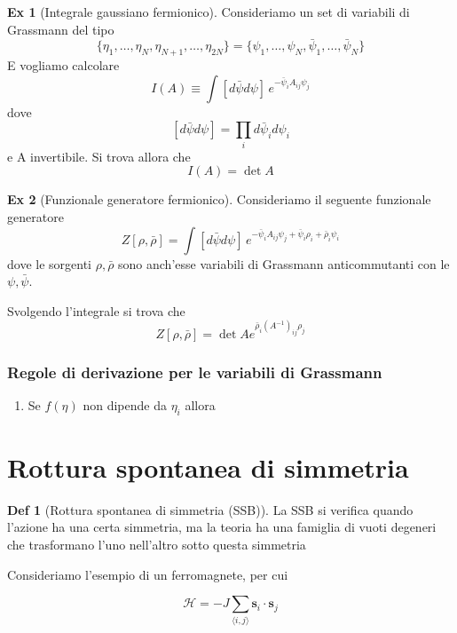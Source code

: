 \documentclass[10pt,a4paper]{article}
\theoremstyle{definition}
\newtheorem{definition}{Def}[section]
\newtheorem{example}{Ex}[section]
\begin{document}
\begin{example}[Integrale gaussiano fermionico]
    Consideriamo un set di variabili di Grassmann del tipo
    \[
    \{\eta_1, \dots, \eta_N, \eta_{N + 1}, \dots, \eta_{2N}\} = \{\psi_1, \dots, \psi_N, \bar{\psi}_1, \dots, \bar{\psi}_N\}    
    \]
    E vogliamo calcolare
    \[
    I(A) \equiv \int [d\bar{\psi}d\psi]\, e^{-\bar{\psi}_i A_{ij}\psi_j}     
    \]
    dove 
    \[
        [d\bar{\psi}d\psi] = \prod_i d\bar{\psi}_i d\psi_i   
    \]
    e A invertibile. Si trova allora che
    \[
    I(A) = \det A    
    \]
\end{example}

\begin{example}[Funzionale generatore fermionico]
    Consideriamo il seguente funzionale generatore 
    \[
    Z[\rho, \bar{\rho}] = \int [d\bar{\psi}d\psi] \, e^{-\bar{\psi}_i A_{ij}\psi_j + \bar{\psi}_i \rho_i + \bar{\rho}_i \psi_i}    
    \]
    dove le sorgenti $\rho, \bar{\rho}$ sono anch'esse variabili di Grassmann anticommutanti con le $\psi, \bar{\psi}$.

    Svolgendo l'integrale si trova che
    \[
    Z[\rho, \bar{\rho}] = \det A e^{\bar{\rho}_i (A^{-1})_{ij}\rho_j}    
    \]
\end{example}  

\subsubsection{Regole di derivazione per le variabili di Grassmann}
\begin{enumerate}
    \item Se $f(\eta)$ non dipende da $\eta_i$ allora 
\end{enumerate}



\section{Rottura spontanea di simmetria}

\begin{definition}[Rottura spontanea di simmetria (SSB)]
    La SSB si verifica quando l'azione ha una certa simmetria, ma la teoria ha una famiglia di vuoti degeneri che trasformano l'uno nell'altro sotto questa simmetria

\end{definition}
Consideriamo l'esempio di un ferromagnete, per cui

\[
\mathcal{H} = -J\sum_{\langle i,j \rangle} \mathbf{s}_i \cdot \mathbf{s}_j
\]
\end{document}
